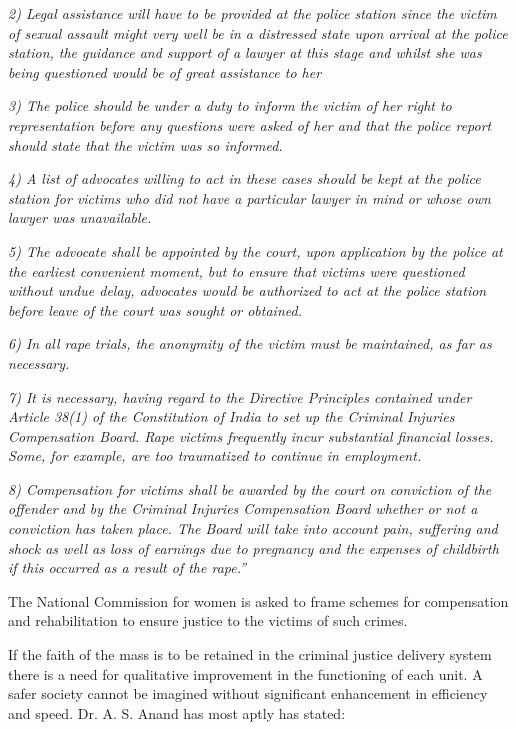 \begin{multicols}{2}
\noi
\textit{2) Legal assistance will have to be provided at the police station since the victim
of sexual assault might very well be in a distressed state upon arrival at the police
station, the guidance and support of a lawyer at this stage and whilst she was being
questioned would be of great assistance to her}

\noi
\textit{3) The police should be under a duty to inform the victim of her right to
representation before any questions were asked of her and that the police report should
state that the victim was so informed.}

\noi
\textit{4) A list of advocates willing to act in these cases should be kept at the police
station for victims who did not have a particular lawyer in mind or whose own lawyer
was unavailable.}

\noi
\textit{5) The advocate shall be appointed by the court, upon application by the police at
the earliest convenient moment, but to ensure that victims were questioned without
undue delay, advocates would be authorized to act at the police station before leave of
the court was sought or obtained.}

\noi
\textit{6) In all rape trials, the anonymity of the victim must be maintained, as far as
necessary.}

\noi
\textit{7) It is necessary, having regard to the Directive Principles contained under
Article 38(1) of the Constitution of India to set up the Criminal Injuries Compensation
Board. Rape victims frequently incur substantial financial losses. Some, for example,
are too traumatized to continue in employment.}

\noi
\textit{8) Compensation for victims shall be awarded by the court on conviction of the
offender and by the Criminal Injuries Compensation Board whether or not a conviction
has taken place. The Board will take into account pain, suffering and shock as well as
loss of earnings due to pregnancy and the expenses of childbirth if this occurred as a
result of the rape.”}

\noi
The National Commission for women is asked to frame schemes for compensation and
rehabilitation to ensure justice to the victims of such crimes.


\noi
If the faith of the mass is to be retained in the criminal justice delivery system there is
a need for qualitative improvement in the functioning of each unit. A safer society
cannot be imagined without significant enhancement in efficiency and speed. Dr. A. S.
Anand has most aptly has stated:


\end{multicols}
